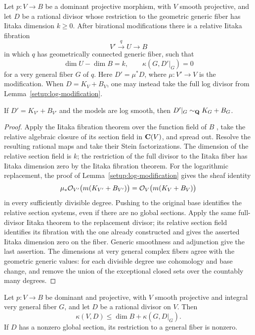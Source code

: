 \begin{lemma}\label{p1logcbfalt:iitaka}
Let \(p:V\to B\) be a dominant projective morphism, with \(V\) smooth
projective, and let \(D\) be a rational divisor whose restriction to the
geometric generic fiber has Iitaka dimension \(k\ge0\). After birational
modifications there is a relative Iitaka fibration
\[
V'\xrightarrow{q}U\longrightarrow B
\]
in which \(q\) has geometrically connected generic fiber, such that
\[
\dim U-\dim B=k,\qquad
\kappa(G,D'|_G)=0
\]
for a very general fiber \(G\) of \(q\). Here \(D'=\mu^*D\), where
\(\mu:V'\to V\) is the modification. When \(D=K_V+B_V\), one may
instead take the full log divisor from Lemma~\ref{setup:log-modification}.

If \(D'=K_{V'}+B_{V'}\) and the models are log smooth, then
\(D'|_G\sim_{\mathbf Q}K_G+B_G\).
\end{lemma}

\begin{proof}
Apply the Iitaka fibration theorem over the function field of \(B\)
\cite[Section~6, Remark~1]{IitakaOriginal},
take the relative algebraic closure of its section field in \(\mathbf C(V)\),
and spread out. Resolve the resulting rational maps and take their
Stein factorizations. The dimension of the relative section field is
\(k\); the restriction of the full divisor to the Iitaka fiber has
Iitaka dimension zero by the Iitaka fibration theorem. For the logarithmic
replacement, the proof of Lemma~\ref{setup:log-modification} gives the sheaf identity
\[
 \mu_*\mathcal O_{V'}\bigl(m(K_{V'}+B_{V'})\bigr)
 =\mathcal O_V\bigl(m(K_V+B_V)\bigr)
\]
in every sufficiently divisible degree. Pushing to the original base
identifies the relative section systems, even if there are no global
sections. Apply the same full-divisor Iitaka theorem to the replacement
divisor; its relative section field identifies its fibration with the
one already constructed and gives the asserted Iitaka dimension zero
on the fiber.
Generic smoothness and adjunction give the last assertion.
The dimensions at very general complex fibers agree with the geometric
generic values: for each divisible degree use cohomology and base
change, and remove the union of the exceptional closed sets over the
countably many degrees.
\end{proof}

\begin{lemma}\label{p1logcbfalt:easy-addition}
Let \(p:V\to B\) be dominant and projective, with \(V\) smooth projective
and integral very general fiber \(G\), and let \(D\) be a rational
divisor on \(V\). Then
\[
\kappa(V,D)\le \dim B+\kappa(G,D|_G).
\]
If \(D\) has a nonzero global section, its restriction to a general
fiber is nonzero.
\end{lemma}


